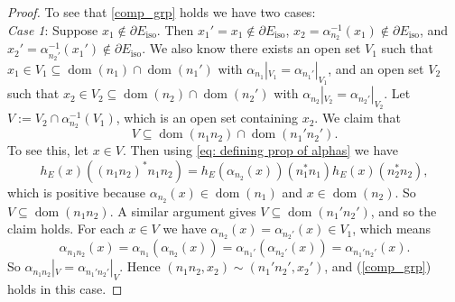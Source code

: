 \documentclass[12pt, a4paper]{amsart}
\numberwithin{equation}{section}
\theoremstyle{definition}
\theoremstyle{remark}
\begin{document}
\begin{proof}
To see that \eqref{comp_grp} holds we have two cases: \\
\emph{Case 1}: Suppose $x_1 \notin \partial E_{{\operatorname{iso}}}$.  Then $x_1'=x_1 \notin 
\partial E_{{\operatorname{iso}}}$, $x_2=\alpha_{n_2}^{-1}(x_1) \notin \partial E_{{\operatorname{iso}}}$, and $x_2' 
= \alpha_{n_2'}^{-1}(x_1') \notin \partial E_{{\operatorname{iso}}}$. We also know there exists 
an open set $V_1$ such that $x_1 \in V_1 \subseteq {{\operatorname{dom}}}(n_1) \cap {{\operatorname{dom}}}(n_1')$ 
with $\alpha_{n_1}|_{V_1}=\alpha_{n_1'}|_{V_1}$, and an open set $V_2$ such 
that $x_2 \in V_2 \subseteq {{\operatorname{dom}}}(n_2) \cap {{\operatorname{dom}}}(n_2')$ with 
$\alpha_{n_2}|_{V_2}=\alpha_{n_2'}|_{V_2}$. Let $V:=V_2 \cap 
\alpha_{n_2}^{-1}(V_1)$, which is an open set containing $x_2$. We claim that 
\[
V\subseteq {{\operatorname{dom}}}(n_1n_2)\cap {{\operatorname{dom}}}(n_1'n_2').
\]
To see this, let $x 
\in V$. Then using \eqref{eq: defining prop of alphas} we have
\[
h_E(x)((n_1n_2)^*n_1 n_2)=h_E(\alpha_{n_2}(x))(n_1^*n_1)h_E(x)(n_2^*n_2),
\]
which is positive because $\alpha_{n_2}(x)\in{{\operatorname{dom}}}(n_1)$ and $x\in{{\operatorname{dom}}}(n_2)$. 
So $V\subseteq{{\operatorname{dom}}}(n_1n_2)$. A similar argument gives 
$V\subseteq{{\operatorname{dom}}}(n_1'n_2')$, and so the claim holds. For each $x\in V$ we have 
$\alpha_{n_2}(x)=\alpha_{n_2'}(x)\in V_1$, which means
\[
\alpha_{n_1n_2}(x)=\alpha_{n_1}(\alpha_{n_2}(x))=\alpha_{n_1'}(\alpha_{n_2'}(x))
=\alpha_{n_1'n_2'}(x).
\]
So $\alpha_{n_1n_2}|_V=\alpha_{n_1'n_2'}|_V$. Hence 
$(n_1n_2,x_2)\sim(n_1'n_2',x_2')$, and (\ref{comp_grp}) holds 
in this case.


\end{proof}
\end{document}
